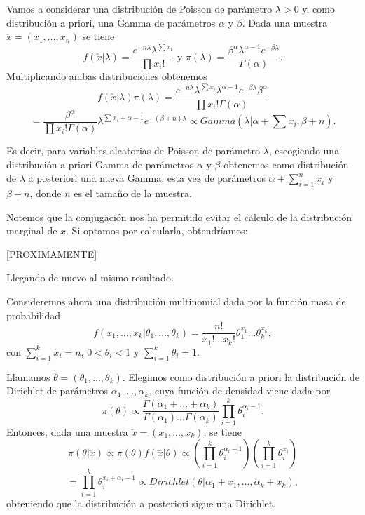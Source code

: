 \begin{ex}
	 Vamos a considerar una distribución de Poisson de parámetro $\lambda > 0$ y, como distribución a priori, una Gamma de parámetros $\alpha$ y $\beta$. Dada una muestra $\utilde{x} = (x_1,\ldots,x_n)$ se tiene
	\[f(\utilde{x}|\lambda) = \frac{e^{-n\lambda}\lambda^{\sum{x_i}}}{\prod{x_i!}} \text{ y } \pi(\lambda)=\frac{\beta^{\alpha}\lambda^{\alpha-1}e^{-\beta\lambda}}{\Gamma(\alpha)}.\]
    Multiplicando ambas distribuciones obtenemos
	\[f(\utilde{x}|\lambda)\pi(\lambda)=\frac{e^{-n\lambda}\lambda^{\sum{x_i}}\lambda^{\alpha-1}e^{-\beta\lambda}\beta^\alpha}{\prod{x_i!}\Gamma(\alpha)}\]
	\[=\frac{\beta^{\alpha}}{\prod{x_i!}\Gamma(\alpha)}\lambda^{\sum{x_i}+\alpha-1}e^{-(\beta+n)\lambda}\propto Gamma\left(\lambda|\alpha+\sum{x_i},\beta+n\right).\]

	Es decir, para variables aleatorias de Poisson de parámetro $\lambda$, escogiendo una distribución a priori Gamma de parámetros $\alpha$ y $\beta$ obtenemos como distribución de $\lambda$ a posteriori una nueva Gamma, esta vez de parámetros $\alpha + \sum_{i = 1}^n{x_i}$ y $\beta+n$, donde $n$ es el tamaño de la muestra.

	Notemos que la conjugación nos ha permitido evitar el cálculo de la distribución marginal de $x$. Si optamos por calcularla, obtendríamos:

	[PROXIMAMENTE]

	Llegando de nuevo al mismo resultado.
\end{ex}

\begin{ex}
	Consideremos ahora una distribución multinomial dada por la función masa de probabilidad
	\[f(x_1,\ldots,x_{k}|\theta_1,\ldots,\theta_{k}) = \frac{n!}{x_1!\ldots x_k!}\theta_1^{x_1}\ldots \theta_k^{x_k},\]
	con $\sum_{i=1}^{k}{x_i} = n$, $0 < \theta_i < 1$ y $\sum_{i=1}^{k}{\theta_i}=1$.

	Llamamos $\theta = (\theta_1,\ldots,\theta_k)$. Elegimos como distribución a priori la distribución de Dirichlet de parámetros $\alpha_1,\ldots,\alpha_k$, cuya función de densidad viene dada por
    \[\pi(\theta) \propto \frac{\Gamma(\alpha_1+\ldots+\alpha_k)}{\Gamma(\alpha_1)\ldots\Gamma(\alpha_k)}\prod_{i=1}^{k}{\theta_i^{\alpha_i-1}}.\]
	Entonces, dada una muestra $\utilde{x}=(x_1,\ldots,x_k)$, se tiene
	\[\pi(\theta|\utilde{x}) \propto \pi(\theta)f(\utilde{x}|\theta)
	\propto \left(\prod_{i=1}^{k}{\theta_i^{\alpha_i-1}}\right)\left(\prod_{i=1}^{k}{\theta_i^{x_i}}\right)\]
	\[ = \prod_{i=1}^{k}{\theta_i^{x_i+\alpha_i-1}} \propto Dirichlet(\theta|\alpha_1+x_1,\ldots,\alpha_k+x_k), \]
    obteniendo que la distribución a posteriori sigue una Dirichlet.
\end{ex}

